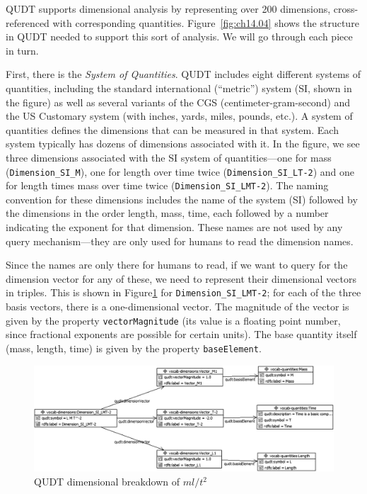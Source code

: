 QUDT supports dimensional analysis by representing over 200 dimensions,
cross-referenced with corresponding quantities. Figure~\ref{fig:ch14.04} shows the
structure in QUDT needed to support this sort of analysis. We will go
through each piece in turn.

First, there is the \emph{System of Quantities}. QUDT includes eight different
systems of quantities, including the standard international (``metric'')
system (SI, shown in the figure) as well as several variants of the CGS
(centimeter-gram-second) and the US Customary system (with inches,
yards, miles, pounds, etc.). A system of quantities defines the
dimensions that can be measured in that system. Each system typically
has dozens of dimensions associated with it. In the figure, we see three
dimensions associated with the SI system of quantities---one for mass
(\texttt{Dimension\_SI\_M}), one for length over time twice (\texttt{Dimension\_SI\_LT-2})
and one for length times mass over time twice (\texttt{Dimension\_SI\_LMT-2}).
The naming convention for these dimensions includes the name of the
system (SI) followed by the dimensions in the order length, mass, time,
each followed by a number indicating the exponent for that dimension.
These names are not used by any query mechanism---they are only used for
humans to read the dimension names.

Since the names are only there for humans to read, if we want to query
for the dimension vector for any of these, we need to represent their
dimensional vectors in triples. This is shown in Figure\ref{fig:ch14.05} for
\texttt{Dimension\_SI\_LMT-2}; for each of the three basis vectors, there is a
one-dimensional vector. The magnitude of the vector is given by the
property \texttt{vectorMagnitude} (its value is a floating point number, since
fractional exponents are possible for certain units). The base quantity
itself (mass, length, time) is given by the property \texttt{baseElement}.


\begin{figure}
\centering
\includegraphics[width=5in]{media/ch14/f14-05.png}
\caption{QUDT dimensional breakdown of $ml/{t^2}$}
\label{fig:ch14.05}
\end{figure}

